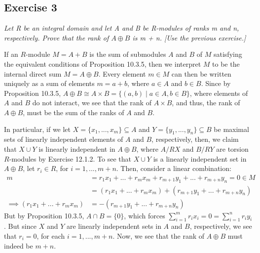 \subsection*{Exercise 3}
\begin{framed}
\textit{Let R be an integral domain and let A and B be R-modules of ranks m and n, respectively. Prove that the rank of $A \oplus B$ is m + n. [Use the previous exercise.]}
\end{framed}

If an $R$-module $M = A+B$ is the sum of submodules $A$ and $B$ of $M$ satisfying the equivalent conditions of Proposition 10.3.5, then we interpret $M$ to be the internal direct sum $M = A \oplus B$. Every element $m \in M$ can then be written uniquely as a sum of elements $m = a + b$, where $a \in A$ and $b \in B$. Since by Proposition 10.3.5, $A \oplus B \cong A \times B = \{(a,b) \mid a \in A, b \in B\}$, where elements of $A$ and $B$ do not interact, we see that the rank of $A \times B$, and thus, the rank of $A \oplus B$, must be the sum of the ranks of $A$ and $B$.

In particular, if we let $X = \{x_1,...,x_m\} \subseteq A$ and $Y = \{y_1,...,y_n\} \subseteq B$ be maximal sets of linearly independent elements of $A$ and $B$, respectively, then, we claim that $X \cup Y$ is linearly independent in $A \oplus B$, where $A/RX$ and $B/RY$ are torsion $R$-modules by Exercise 12.1.2. To see that $X \cup Y$ is a linearly independent set in $A \oplus B$, let $r_i \in R$, for $i = 1,...,m+n$. Then, consider a linear combination: \begin{align*}
    m &= r_1x_1 + ... + r_mx_m + r_{m+1}y_1 + ... + r_{m+n}y_n = 0 \in M \\
    &= (r_1x_1 + ... + r_mx_m) + (r_{m+1}y_1 + ... + r_{m+n}y_n) \\
    \implies (r_1x_1 + ... + r_mx_m) &= -(r_{m+1}y_1 + ... + r_{m+n}y_n)
\end{align*}
But by Proposition 10.3.5, $A \cap B = \{0\}$, which forces $\sum_{i=1}^mr_ix_i = 0 = \sum_{i=1}^nr_iy_i$. But since $X$ and $Y$ are linearly independent sets in $A$ and $B$, respectively, we see that $r_i = 0$, for each $i = 1,...,m+n$. Now, we see that the rank of $A \oplus B$ must indeed be $m + n$.